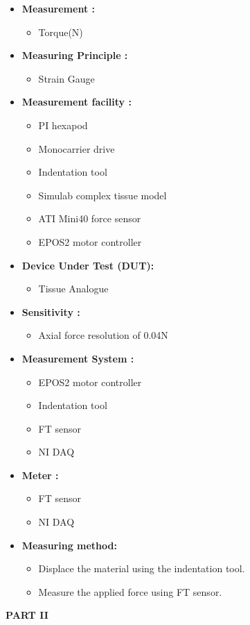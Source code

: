 \documentclass[10pt,a4paper]{article}
\begin{document}
\begin{enumerate}[label=\Roman*]
\begin{itemize}
		\item
		\textbf{Measurement :}
		\begin{itemize}
			\item
			Torque(N)
		\end{itemize}
		\item
		\textbf{Measuring Principle :}
		\begin{itemize}
			\item
			Strain Gauge
		\end{itemize} 
		\item
		\textbf{Measurement facility :}
		\begin{itemize}
			\item
			PI hexapod
			\item
			Monocarrier drive
			\item
			Indentation tool
			\item
			Simulab complex tissue model
			\item
			ATI Mini40 force sensor
			\item
			EPOS2 motor controller
		\end{itemize} 
		\item
		\textbf{Device Under Test (DUT):}
		\begin{itemize}
			\item
			Tissue Analogue
		\end{itemize} 
		\item
		\textbf{Sensitivity :}
		\begin{itemize}
			\item
			Axial force resolution of 0.04N
		\end{itemize} 
		\item
		\textbf{Measurement System :}
		\begin{itemize}
			\item
			EPOS2 motor controller
			\item
			Indentation tool
			\item
			FT sensor
			\item
			NI DAQ
		\end{itemize}
		\item
		\textbf{Meter :}
		\begin{itemize}
			\item
			FT sensor
			\item
			NI DAQ
		\end{itemize}
		\item
		\textbf{Measuring method: }
		\begin{itemize}
			\item
			Displace the material using the indentation tool.
			\item
			Measure the applied force using FT sensor.
		\end{itemize}
		
		
		
	\end{itemize}
	
	
\end{enumerate}	
\newpage
\Large\textbf{PART II}
\end{document}
